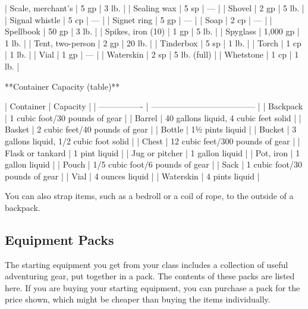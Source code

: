 | Scale, merchant's            | 5 gp     | 3 lb.        |
| Sealing wax                  | 5 sp     | —            |
| Shovel                       | 2 gp     | 5 lb.        |
| Signal whistle               | 5 cp     | —            |
| Signet ring                  | 5 gp     | —            |
| Soap                         | 2 cp     | —            |
| Spellbook                    | 50 gp    | 3 lb.        |
| Spikes, iron (10)            | 1 gp     | 5 lb.        |
| Spyglass                     | 1,000 gp | 1 lb.        |
| Tent, two-person             | 2 gp     | 20 lb.       |
| Tinderbox                    | 5 sp     | 1 lb.        |
| Torch                        | 1 cp     | 1 lb.        |
| Vial                         | 1 gp     | —            |
| Waterskin                    | 2 sp     | 5 lb. (full) |
| Whetstone                    | 1 cp     | 1 lb.        |

**Container Capacity (table)**

| Container        | Capacity                               |
| ---------------- | -------------------------------------- |
| Backpack\*       | 1 cubic foot/30 pounds of gear         |
| Barrel           | 40 gallons liquid, 4 cubic feet solid  |
| Basket           | 2 cubic feet/40 pounds of gear         |
| Bottle           | 1½ pints liquid                        |
| Bucket           | 3 gallons liquid, 1/2 cubic foot solid |
| Chest            | 12 cubic feet/300 pounds of gear       |
| Flask or tankard | 1 pint liquid                          |
| Jug or pitcher   | 1 gallon liquid                        |
| Pot, iron        | 1 gallon liquid                        |
| Pouch            | 1/5 cubic foot/6 pounds of gear        |
| Sack             | 1 cubic foot/30 pounds of gear         |
| Vial             | 4 ounces liquid                        |
| Waterskin        | 4 pints liquid                         |

 You can also strap items, such as a bedroll or a coil of rope, to the outside of a backpack.

\subsection{Equipment Packs}

The starting equipment you get from your class includes a collection of useful adventuring gear, put together in a pack. The contents of these packs are listed here. If you are buying your starting equipment, you can purchase a pack for the price shown, which might be cheaper than buying the items individually.

